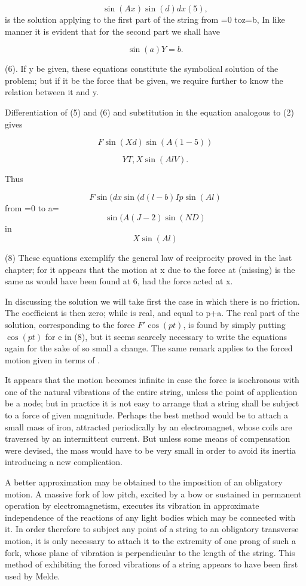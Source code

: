 \[\sin(Ax)  \sin(d) dx (5),\]
is the solution applying to the first part of the
string from =0 toz=b, In like manner it is evident that for the second part we
shall have

\[\sin(a) Y= b.\]

(6). If y be given, these equations constitute the symbolical solution of the
problem; but if it be the force that be given, we require further to know the
relation between it and y.


Differentiation of (5) and (6) and substitution in the equation analogous to
(2) gives

\[F \sin(Xd) \sin(A(1 - 5))\]

\[YT, X \sin(Al V).\]

Thus

\[F \sin(dx \sin(d(l-b) Ip \sin(Al)\]
 from =0 to a=
\[\sin(A(J- 2) \sin(ND)\]
in
\[X \sin(Al)\]

(8) These equations exemplify the general law of reciprocity proved in the last
chapter; for it appears that the motion at x due to the force at (missing) is
the same as would have been found at 6, had the force acted at x.

In discussing the solution we will take first the case in which there is no
friction. The coefficient is then zero; while is real, and equal to p+a. The
real part of the solution, corresponding to the force \(F' \cos(pt)\), is found
by simply putting \(\cos(pt)\) for e in (8), but it seems scarcely necessary to
write the equations again for the sake of so small a change. The same remark
applies to the forced motion given in terms of .

It appears that the motion becomes infinite in case the force is isochronous
with one of the natural vibrations of the entire string, unless the point of
application be a node; but in practice it is not easy to arrange that a string
shall be subject to a force of given magnitude. Perhaps the best method would
be to attach a small mass of iron, attracted periodically by an electromagnet,
whose coils are traversed by an intermittent current. But unless some means of
compensation were devised, the mass would have to be very small in order to
avoid its inertia introducing a new complication.

A better approximation may be obtained to the imposition of an obligatory
motion. A massive fork of low pitch, excited by a bow or sustained in permanent
operation by electromagnetism, executes its vibration in approximate
independence of the reactions of any light bodies which may be connected with
it. In order therefore to subject any point of a string to an obligatory
transverse motion, it is only necessary to attach it to the extremity of one
prong of such a fork, whose plane of vibration is perpendicular to the length
of the string. This method of exhibiting the forced vibrations of a string
appears to have been first used by Melde.

